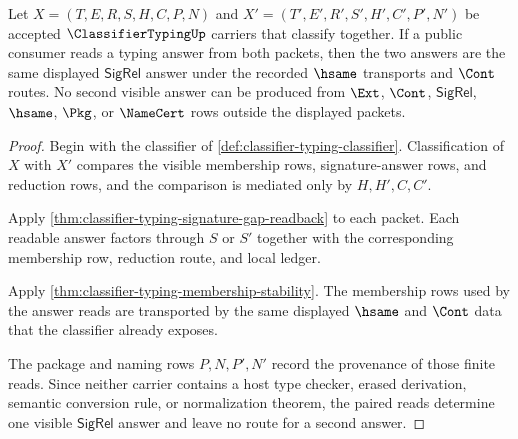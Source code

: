 \begin{theorem}
\label{thm:classifiertyping-visible-answer-determinacy}
Let $X=(T,E,R,S,H,C,P,N)$ and $X'=(T',E',R',S',H',C',P',N')$ be accepted $\ClassifierTypingUp$ carriers that classify together. If a public consumer reads a typing answer from both packets, then the two answers are the same displayed $\mathsf{SigRel}$ answer under the recorded $\hsame$ transports and $\Cont$ routes. No second visible answer can be produced from $\Ext$, $\Cont$, $\mathsf{SigRel}$, $\hsame$, $\Pkg$, or $\NameCert$ rows outside the displayed packets.
\end{theorem}
\begin{proof}
Begin with the classifier of \autoref{def:classifier-typing-classifier}. Classification of $X$ with $X'$ compares the visible membership rows, signature-answer rows, and reduction rows, and the comparison is mediated only by $H,H',C,C'$.

Apply \autoref{thm:classifier-typing-signature-gap-readback} to each packet. Each readable answer factors through $S$ or $S'$ together with the corresponding membership row, reduction route, and local ledger.

Apply \autoref{thm:classifier-typing-membership-stability}. The membership rows used by the answer reads are transported by the same displayed $\hsame$ and $\Cont$ data that the classifier already exposes.

The package and naming rows $P,N,P',N'$ record the provenance of those finite reads. Since neither carrier contains a host type checker, erased derivation, semantic conversion rule, or normalization theorem, the paired reads determine one visible $\mathsf{SigRel}$ answer and leave no route for a second answer.
\end{proof}

